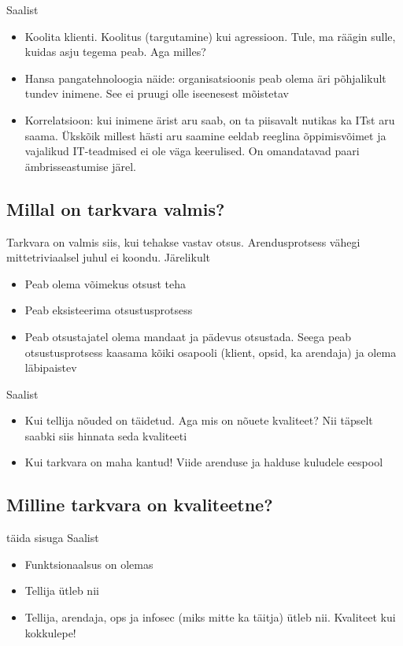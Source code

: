 \TODO
Saalist
\begin{itemize}
	\item Koolita klienti. Koolitus (targutamine) kui agressioon. Tule, ma räägin sulle, kuidas asju tegema peab. Aga milles?
	\item Hansa pangatehnoloogia näide: organisatsioonis peab olema äri põhjalikult tundev inimene. See ei pruugi olle iseenesest mõistetav
	\item Korrelatsioon: kui inimene ärist aru saab, on ta piisavalt nutikas ka ITst aru saama. Ükskõik millest hästi aru saamine eeldab reeglina õppimisvõimet ja vajalikud IT-teadmised ei ole väga keerulised. On omandatavad paari ämbrisseastumise järel.
\end{itemize}

\subsection{Millal on tarkvara valmis?}
Tarkvara on valmis siis, kui tehakse vastav otsus. Arendusprotsess vähegi mittetriviaalsel juhul ei koondu. Järelikult
\begin{itemize}
	\item Peab olema võimekus otsust teha
	\item Peab eksisteerima otsustusprotsess
	\item Peab otsustajatel olema mandaat ja pädevus otsustada. Seega peab otsustusprotsess kaasama kõiki osapooli (klient, opsid, ka arendaja) ja olema läbipaistev
\end{itemize}

Saalist
\begin{itemize}
	\item Kui tellija nõuded on täidetud. Aga mis on nõuete kvaliteet? Nii täpselt saabki siis hinnata seda kvaliteeti
	\item Kui tarkvara on maha kantud! Viide arenduse ja halduse kuludele eespool
\end{itemize}

\subsection{Milline tarkvara on kvaliteetne?}
\TODO täida sisuga
Saalist
\begin{itemize}
	\item Funktsionaalsus on olemas
	\item Tellija ütleb nii
	\item Tellija, arendaja, ops ja infosec (miks mitte ka täitja) ütleb nii. Kvaliteet kui kokkulepe!
\end{itemize}

